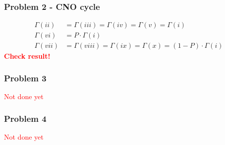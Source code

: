 \documentclass[10pt,a4paper]{article}
\theoremstyle{definition}
\begin{document}
\subsubsection{Problem 2 - CNO cycle}
\begin{align}
    \Gamma(ii)&=\Gamma(iii)=\Gamma(iv)=\Gamma(v)=\Gamma(i)\\
    \Gamma(vi)&=P\cdot\Gamma(i)\\
    \Gamma(vii)&=\Gamma(viii)=\Gamma(ix)=\Gamma(x)=(1-P)\cdot\Gamma(i)
\end{align}
\textcolor{red}{\bf Check result!}

\subsubsection{Problem 3}
\textcolor{red}{Not done yet}

\subsubsection{Problem 4}
\textcolor{red}{Not done yet}
\end{document}
